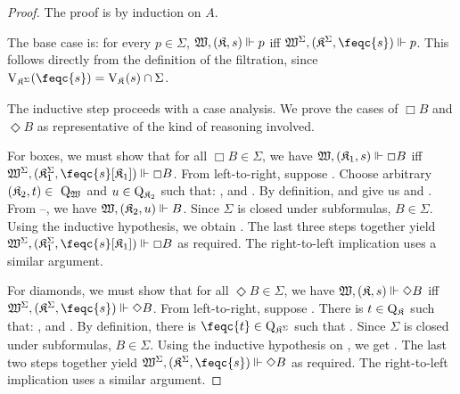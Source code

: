 \begin{proof}
    \setcounter{ieqnnum}{0}
    The proof is by induction on $A$.

    \medskip
    \noindent
    The base case is: for every $p \in \Sigma$, $\wforces {\pair \kmodel s} p$ iff $\xforces {\fwmodel} {\pair {\fmodel} {\feqc{s}}} p$. This follows directly from the definition of the filtration, since $\Vof{\fmodel}(\feqc{s}) = \Vkm(s) \cap \Sigma$.

    \medskip
    \noindent
    The inductive step proceeds with a case analysis.
    We prove the cases of $\Box B$ and $\Diamond B$ as representative of the kind of reasoning involved.

    \medskip
    \noindent
    For boxes, we must show that for all $\Box B \in \Sigma$, we have $\wforces {\pair {\kmodel_1} s} \Box B$ iff $\xforces {\fwmodel} {\pair {\fmodel[1]} {\feqc{s}[\kmodel_1]}} \Box B$.
    From left-to-right, suppose
        .
    Choose arbitrary ${\pair {\kmodel_2} t} \in~\Qwm$ and $u \in \Wkm[2]$ such that:
        , and
        .
    By definition,  and  give us
         and
        .
    From --, we have $\wforces {\pair {\kmodel_2} u} B$.
    Since $\Sigma$ is closed under subformulas, $B \in \Sigma$.
    Using the inductive hypothesis, we obtain
        .
    The last three steps together yield $\xforces {\fwmodel} {\pair {\fmodel[1]} {\feqc{s}[\kmodel_1]}} \Box B$ as required.
    The right-to-left implication uses a similar argument.

    \medskip
    \noindent
    For diamonds, we must show that for all $\Diamond B \in \Sigma$, we have $\wforces {\pair \kmodel s} \Diamond B$ iff $\xforces {\fwmodel} {\pair {\fmodel} {\feqc{s}}} \Diamond B$.
    From left-to-right, suppose
        .
    There is $t \in \Wkm$ such that:
        , and
        .
    By definition, there is ${\feqc{t}} \in \Qof{\fmodel}$ such that
        .
    Since $\Sigma$ is closed under subformulas, $B \in \Sigma$.
    Using the inductive hypothesis on , we get
        .
    The last two steps together yield $\xforces {\fwmodel} {\pair {\fmodel} {\feqc{s}}} \Diamond B$ as required.
    The right-to-left implication uses a similar argument.
\end{proof}

